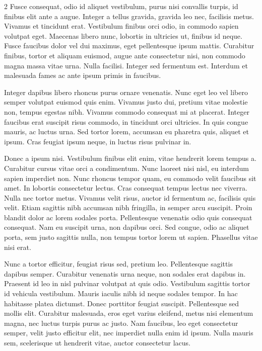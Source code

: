\documentclass[twoside]{article}
\begin{document}
\begin{multicols}{2}
Fusce consequat, odio id aliquet vestibulum, purus nisi convallis turpis, id finibus elit ante a augue. Integer a tellus gravida, gravida leo nec, facilisis metus. Vivamus et tincidunt erat. Vestibulum finibus orci odio, in commodo sapien volutpat eget. Maecenas libero nunc, lobortis in ultricies ut, finibus id neque. Fusce faucibus dolor vel dui maximus, eget pellentesque ipsum mattis. Curabitur finibus, tortor et aliquam euismod, augue ante consectetur nisi, non commodo magna massa vitae urna. Nulla facilisi. Integer sed fermentum est. Interdum et malesuada fames ac ante ipsum primis in faucibus.

Integer dapibus libero rhoncus purus ornare venenatis. Nunc eget leo vel libero semper volutpat euismod quis enim. Vivamus justo dui, pretium vitae molestie non, tempus egestas nibh. Vivamus commodo consequat mi at placerat. Integer faucibus erat suscipit risus commodo, in tincidunt orci ultricies. In quis congue mauris, ac luctus urna. Sed tortor lorem, accumsan eu pharetra quis, aliquet et ipsum. Cras feugiat ipsum neque, in luctus risus pulvinar in.

Donec a ipsum nisi. Vestibulum finibus elit enim, vitae hendrerit lorem tempus a. Curabitur cursus vitae orci a condimentum. Nunc laoreet nisi nisl, eu interdum sapien imperdiet non. Nunc rhoncus tempor quam, eu commodo velit faucibus sit amet. In lobortis consectetur lectus. Cras consequat tempus lectus nec viverra. Nulla nec tortor metus. Vivamus velit risus, auctor id fermentum ac, facilisis quis velit. Etiam sagittis nibh accumsan nibh fringilla, in semper arcu suscipit. Proin blandit dolor ac lorem sodales porta. Pellentesque venenatis odio quis consequat consequat. Nam eu suscipit urna, non dapibus orci. Sed congue, odio ac aliquet porta, sem justo sagittis nulla, non tempus tortor lorem ut sapien. Phasellus vitae nisi erat.

Nunc a tortor efficitur, feugiat risus sed, pretium leo. Pellentesque sagittis dapibus semper. Curabitur venenatis urna neque, non sodales erat dapibus in. Praesent id leo in nisl pulvinar volutpat at quis odio. Vestibulum sagittis tortor id vehicula vestibulum. Mauris iaculis nibh id neque sodales tempor. In hac habitasse platea dictumst. Donec porttitor feugiat suscipit. Pellentesque sed mollis elit. Curabitur malesuada, eros eget varius eleifend, metus nisi elementum magna, nec luctus turpis purus ac justo. Nam faucibus, leo eget consectetur semper, velit justo efficitur elit, nec imperdiet nulla enim id ipsum. Nulla mauris sem, scelerisque ut hendrerit vitae, auctor consectetur lacus.


\end{multicols}
\end{document}
